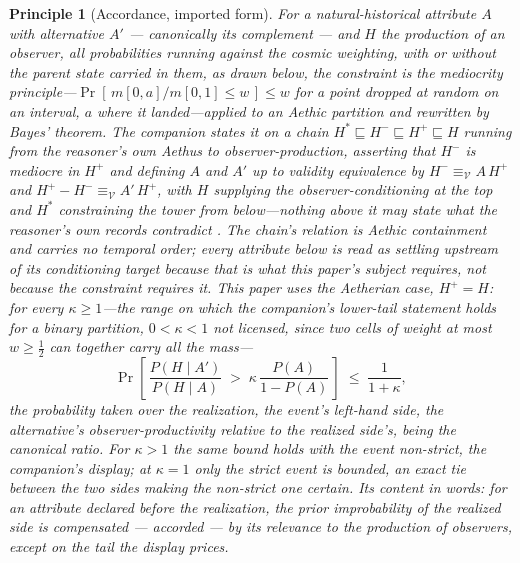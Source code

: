 \documentclass[11pt]{article}
\newtheorem{principle}{Principle}
\theoremstyle{definition}
\begin{document}
\begin{principle}[Accordance, imported form]
\label{prin:accordance-imported}
For a natural-historical attribute $A$ with alternative $A'$ --- canonically its complement --- and $H$ the production of an observer, all probabilities running against the cosmic weighting, with or without the parent state carried in them, as drawn below, the constraint is the mediocrity principle---$\Pr[\,m[0,a]/m[0,1] \le w\,] \le w$ for a point dropped at random on an interval, $a$ where it landed---applied to an Aethic partition and rewritten by Bayes' theorem. The companion states it on a chain $H^{\ast} \sqsubseteq H^{-} \sqsubseteq H^{+} \sqsubseteq H$ running from the reasoner's own Aethus to observer-production, asserting that $H^{-}$ is mediocre in $H^{+}$ and defining $A$ and $A'$ up to validity equivalence by $H^{-} \equiv_{\mathcal{V}} A\,H^{+}$ and $H^{+} - H^{-} \equiv_{\mathcal{V}} A'\,H^{+}$, with $H$ supplying the observer-conditioning at the top and $H^{\ast}$ constraining the tower from below---nothing above it may state what the reasoner's own records contradict \cite{Nexus}. The chain's relation is Aethic containment and carries no temporal order; every attribute below is read as settling upstream of its conditioning target because that is what this paper's subject requires, not because the constraint requires it. This paper uses the Aetherian case, $H^{+} = H$: for every $\kappa \ge 1$---the range on which the companion's lower-tail statement holds for a binary partition, $0 < \kappa < 1$ not licensed, since two cells of weight at most $w \ge \tfrac12$ can together carry all the mass---
\begin{equation}
\label{eq:accordance}
\Pr\!\left[\, \frac{P(H \mid A')}{P(H \mid A)} \;>\; \kappa\, \frac{P(A)}{1 - P(A)} \,\right] \;\le\; \frac{1}{1+\kappa},
\end{equation}
the probability taken over the realization, the event's left-hand side, the alternative's observer-productivity relative to the realized side's, being the \emph{canonical ratio}. For $\kappa > 1$ the same bound holds with the event non-strict, the companion's display; at $\kappa = 1$ only the strict event is bounded, an exact tie between the two sides making the non-strict one certain. Its content in words: for an attribute declared before the realization, the prior improbability of the realized side is compensated --- \emph{accorded} --- by its relevance to the production of observers, except on the tail the display prices.
\end{principle}
\end{document}
